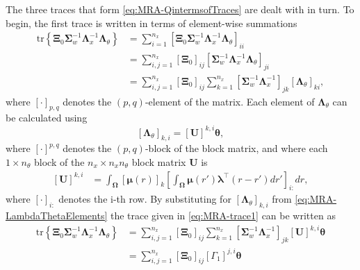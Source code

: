\documentclass[review,authoryear,3p]{elsarticle}
\begin{document}
The three traces that form \eqref{eq:MRA-QintermsofTraces} are dealt with in turn. To begin, the first trace is written in terms of element-wise summations
\begin{align}\label{eq:MRA-trace1}
\mathrm{tr} \left\lbrace \boldsymbol \Xi_0\boldsymbol\Sigma_w^{-1}\boldsymbol\Lambda_x^{-1}\boldsymbol\Lambda_{\theta}\right\rbrace&=\sum_{i=1}^{n_x}\left[ \boldsymbol \Xi_0\boldsymbol\Sigma_w^{-1}\boldsymbol\Lambda_x^{-1}\boldsymbol\Lambda_{\theta}\right]_{ii} \nonumber \\
&=\sum_{i,j=1}^{n_x}\left[ \boldsymbol\Xi_0\right]_{ij}\left[\boldsymbol\Sigma_w^{-1}\boldsymbol\Lambda_x^{-1}  \boldsymbol\Lambda_{\theta}\right]_{ji}\nonumber\\
&=\sum_{i,j=1}^{n_x}\left[ \boldsymbol\Xi_0\right]_{ij}\sum_{k=1}^{n_x}\left[\boldsymbol\Sigma_w^{-1}\boldsymbol\Lambda_x^{-1} \right]_{jk} \left[ \boldsymbol\Lambda_{\theta}\right]_{ki},
\end{align}
where $[\cdot]_{p,q}$ denotes the $\left(p,q\right)$-element of the matrix. Each element of $\boldsymbol\Lambda_{\theta}$ can be calculated using
\begin{equation}\label{eq:MRA-LambdaThetaElements}
\left[ \boldsymbol\Lambda_{\theta}\right] _{k,i}=\left[ \mathbf U\right]^{k,i}\boldsymbol\theta,
\end{equation}
where $ [\cdot]^{p,q}$ denotes the $\left(p,q\right)$-block of the block matrix, and where
each $ 1 \times n_{\theta}$ block of the $n_x \times n_x n_{\theta}$ block matrix $\mathbf U$ is 
\begin{align}
\left[ \mathbf U\right] ^{k,i}&=\int_{\boldsymbol \Omega}\left[\boldsymbol\mu(r) \right]_k \left[\int_{\boldsymbol\Omega} \boldsymbol\mu\left(r'\right)\boldsymbol \lambda^\top \left(r-r'\right) dr'\right]_{i:} dr,
\end{align}
where $[\cdot]_{i:} $ denotes the i-th row.  By substituting for $\left[ \boldsymbol\Lambda_{\theta}\right] _{k,i}$ from \eqref{eq:MRA-LambdaThetaElements} the trace given in \eqref{eq:MRA-trace1} can be written as
\begin{align}
\mathrm{tr} \left\lbrace \boldsymbol \Xi_0\boldsymbol\Sigma_w^{-1}\boldsymbol\Lambda_x^{-1}\boldsymbol\Lambda_{\theta}\right\rbrace&=\sum_{i,j=1}^{n_x}\left[ \boldsymbol\Xi_0\right]_{ij}\sum_{k=1}^{n_x}\left[ \boldsymbol\Sigma_w^{-1}\boldsymbol\Lambda_x^{-1}\right]_{jk} \left[ \mathbf U\right]^{k,i}\boldsymbol\theta \nonumber \\
&=\sum_{i,j=1}^{n_x}\left[ \boldsymbol\Xi_0\right]_{ij}\left[ \Gamma_1\right] ^{j,i}\boldsymbol\theta
\end{align}
\end{document}
